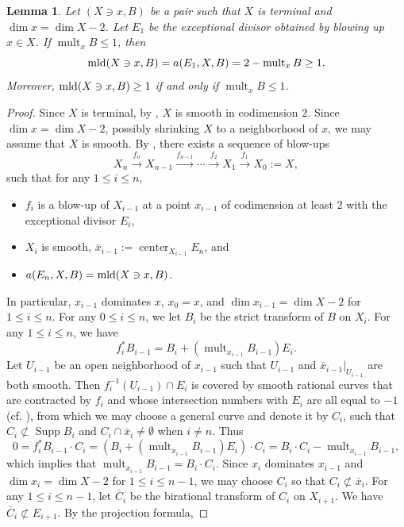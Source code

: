 \documentclass[11pt]{amsart}
\numberwithin{equation}{section}
\newcommand\han[1]{\todo[color=yellow!40]{#1}} %
\newcommand{\Center}{\operatorname{center}}
\newcommand{\mld}{{\rm{mld}}}
\newcommand{\Supp}{\operatorname{Supp}}
\newcommand{\mult}{\operatorname{mult}}
\newtheorem{lem}[thm]{Lemma}
\theoremstyle{definition}
\theoremstyle{definition}
\begin{document}
\begin{lem}\label{lem: Terminal blow up}
Let $(X\ni x,B)$ be a pair such that $X$ is terminal and $\dim x=\dim X-2$. Let $E_1$ be the exceptional divisor obtained by blowing up $x\in X$. If $\mult_x B\leq 1$, then $$\mld(X\ni x, B)=a(E_1,X,B)=2-\mult_x B\geq 1.$$
Moreover, $\mld(X\ni x,B)\geq 1$ if and only if $\mult_x B\leq 1$.
\end{lem}
\begin{proof}
Since $X$ is terminal, by \cite[Corollary 5.18]{KM98}, $X$ is smooth in codimension $2$. Since $\dim x=\dim X-2$, possibly shrinking $X$ to a neighborhood of $x$, we may assume that $X$ is smooth. By \cite[Lemma 2.45]{KM98}, there exists a sequence of blow-ups
$$X_n\xrightarrow{f_n} X_{n-1}\xrightarrow{f_{n-1}}\cdots\xrightarrow{f_2} X_1\xrightarrow{f_1} X_0:=X,$$
such that for any $1\leq i\leq n$,
 \begin{itemize}
     \item  $f_i$ is a blow-up of $X_{i-1}$ at a point $x_{i-1}$ of codimension at least $2$ with the exceptional divisor $E_i$,
     \item $X_i$ is smooth, $\bar{x}_{i-1}:=\Center_{X_{i-1}}E_n$, and
     \item $a(E_n,X,B)=\mld(X\ni x,B)$.
 \end{itemize}
In particular, $x_{i-1}$ dominates $x$, $x_0=x$, and $\dim x_{i-1}=\dim X-2$ for $1\leq i\leq n$. For any $0\leq i\leq n$, we let $B_{i}$ be the strict transform of $B$ on $X_i$. For any $1\leq i\leq n$, we have $$f_i^*{B_{i-1}}=B_{i}+(\mult_{x_{i-1}} B_{i-1}) E_i.$$ Let $U_{i-1}$ be an open neighborhood of $x_{i-1}$ such that $U_{i-1}$ and $\bar{x}_{i-1}|_{U_{i-1}}$ are both smooth. Then $f_{i}^{-1}(U_{i-1})\cap E_i$ is covered by smooth rational curves that are contracted by $f_i$ and whose intersection numbers with $E_i$ are all equal to $-1$ (cf. \cite[\S2,~Theorem~8.24(c)]{Har77}), from which we may choose a general curve and denote it by $C_i$, such that $C_i\not\subset \Supp B_i$ and $C_i\cap\bar x_i\not=\emptyset$ when $i\not=n$. Thus
 $$0=f_i^*{B_{i-1}}\cdot C_i=(B_i+(\mult_{x_{i-1}} B_{i-1}) E_i)\cdot C_i=B_{i}\cdot C_i-\mult_{x_{i-1}} B_{i-1},$$ 
 which implies that $\mult_{x_{i-1}}B_{i-1}= B_i\cdot C_i$. Since $x_i$ dominates $x_{i-1}$ and $\dim x_i=\dim X-2$ for $1\leq i\leq n-1$, we may choose $C_i$ so that $C_i\not\subset\bar x_i$. For any $1\leq i\leq n-1$, let $\bar C_i$ be the birational transform of $C_i$ on $X_{i+1}$. We have $\bar C_i\not\subset E_{i+1}$. By the projection formula,

\end{proof}
\end{document}
